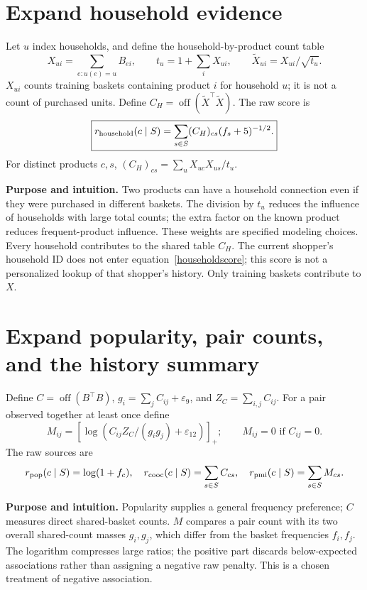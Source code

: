 \documentclass[11pt,a4paper]{article}
\newcommand{\off}{\operatorname{off}}\newcommand{\diag}{\operatorname{diag}}
\newcommand{\why}{\par\textbf{Purpose and intuition.} }
\numberwithin{equation}{section}
\begin{document}
\section{Expand household evidence}\label{household}
Let $u$ index households, and define the household-by-product count table
\begin{equation}
X_{ui}=\sum_{e:u(e)=u}B_{ei},\qquad t_u=1+\sum_iX_{ui},\qquad
\widetilde X_{ui}=X_{ui}/\sqrt{t_u}.
\end{equation}
$X_{ui}$ counts training baskets containing product $i$ for household $u$; it is not a
count of purchased units. Define $C_H=\off(\widetilde X^\top\widetilde X)$. The raw score is
\begin{equation}\label{householdscore}
\boxed{r_{\rm household}(c\mid S)=\sum_{s\in S}(C_H)_{cs}(f_s+5)^{-1/2}.}
\end{equation}
For distinct products $c,s$, $(C_H)_{cs}=\sum_u X_{uc}X_{us}/t_u$.
\why Two products can have a household connection even if they were purchased in different
baskets. The division by $t_u$ reduces the influence of households with large total counts;
the extra factor on the known product reduces frequent-product influence. These weights
are specified modeling choices. Every household contributes to the shared table $C_H$.
The current shopper's household ID does not enter equation~\eqref{householdscore}; this
score is not a personalized lookup of that shopper's history. Only training baskets
contribute to $X$.

\section{Expand popularity, pair counts, and the history summary}
Define $C=\off(B^\top B)$, $g_i=\sum_jC_{ij}+\varepsilon_9$, and
$Z_C=\sum_{i,j}C_{ij}$. For a pair observed together at least once define
\begin{equation}
M_{ij}=[\log(C_{ij}Z_C/(g_i g_j)+\varepsilon_{12})]_+;
\qquad M_{ij}=0\text{ if }C_{ij}=0.
\end{equation}
The raw sources are
\begin{equation}
r_{\rm pop}(c\mid S)=\log(1+f_c),\quad
r_{\rm cooc}(c\mid S)=\sum_{s\in S}C_{cs},\quad
r_{\rm pmi}(c\mid S)=\sum_{s\in S}M_{cs}.
\end{equation}
\why Popularity supplies a general frequency preference; $C$ measures direct shared-basket
counts. $M$ compares a pair count with its two overall shared-count masses $g_i,g_j$,
which differ from the basket frequencies $f_i,f_j$. The logarithm compresses large ratios;
the positive part discards below-expected associations rather than assigning a negative
raw penalty. This is a chosen treatment of negative association.
\end{document}
